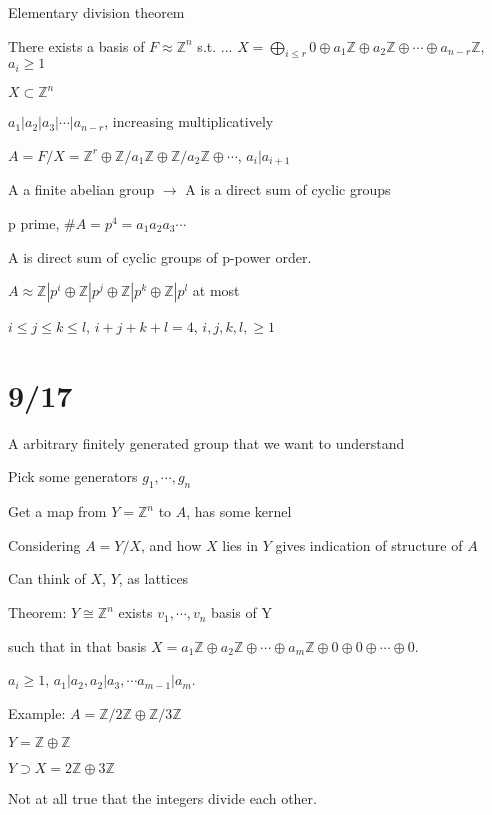 \documentclass[12pt]{article}
\begin{document}
\noindent
Elementary division theorem

There exists a basis of $F \approx \mathds{Z}^n$ s.t. ... $X = \bigoplus_{i \leq r}0 \oplus a_1\mathds{Z} \oplus a_2\mathds{Z} \oplus \cdots \oplus a_{n - r}\mathds{Z}$, $a_i \geq 1$

$X \subset \mathds{Z}^n$

$a_1 | a_2 | a_3 | \cdots | a_{n - r}$, increasing multiplicatively

$A = F/X = \mathds{Z}^r \oplus \mathds{Z}/a_1\mathds{Z} \oplus \mathds{Z}/a_2\mathds{Z} \oplus \cdots$, $a_i | a_{i + 1}$

A a finite abelian group $\to$ A is a direct sum of cyclic groups

\noindent
p prime, $\#A = p^4 = a_1a_2a_3\cdots$

A is direct sum of cyclic groups of p-power order.

$A \approx \mathds{Z}|p^i \oplus \mathds{Z}|p^j \oplus \mathds{Z}|p^k \oplus \mathds{Z}|p^l$ at most

$i \leq j \leq k \leq l$, $i + j + k + l = 4$, $i, j, k, l, \geq 1$

\section{9/17}

A arbitrary finitely generated group that we want to understand

Pick some generators $g_1, \cdots, g_n$

Get a map from $Y = \mathds{Z}^n$ to $A$, has some kernel

Considering $A = Y/X$, and how $X$ lies in $Y$ gives indication of structure of $A$

Can think of $X$, $Y$, as lattices

\noindent
Theorem: $Y \cong \mathds{Z}^n$ exists $v_1, \cdots, v_n$ basis of Y

such that in that basis $X = a_1\mathds{Z} \oplus a_2\mathds{Z} \oplus \cdots \oplus a_m\mathds{Z} \oplus 0 \oplus 0 \oplus \cdots \oplus 0.$

$a_i \geq 1$, $a_1 | a_2, a_2 | a_3, \cdots a_{m - 1}|a_m$.

\noindent
Example: $A = \mathds{Z}/2\mathds{Z} \oplus \mathds{Z}/3\mathds{Z}$

$Y = \mathds{Z} \oplus \mathds{Z}$

$Y \supset X = 2\mathds{Z} \oplus 3\mathds{Z}$

Not at all true that the integers divide each other.
\end{document}

